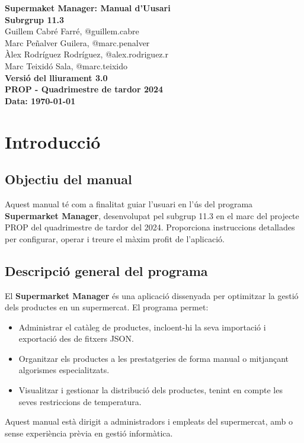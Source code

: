 \documentclass[a4paper,12pt]{article}
\newcommand{\titolPractica}{Supermaket Manager: \textbf{Manual d'Uusari}}
\newcommand{\identificadorEquip}{Subrgrup 11.3}
\newcommand{\PROPquatrimestre}{PROP - Quadrimestre de tardor 2024}
\newcommand{\versioLliurament}{Versió del lliurament 3.0}
\begin{document}
	
	\begin{titlepage}
		\begin{center}
			{\Large \textbf{\titolPractica}} \\[10cm]
			\textbf{\large \identificadorEquip} \\[1cm]
			Guillem Cabré Farré, \small{@guillem.cabre} \\
			Marc Peñalver Guilera, \small{@marc.penalver} \\
			Àlex Rodríguez Rodríguez, \small{@alex.rodriguez.r} \\
			Marc Teixidó Sala, \small{@marc.teixido} \\[2cm]
			\textbf{\versioLliurament} \\
			\textbf{\PROPquatrimestre} \\
			\textbf{Data: \today}
		\end{center}
	\end{titlepage}
	
	\tableofcontents
	\clearpage
	
	\section{Introducció}
	\subsection{Objectiu del manual}
	Aquest manual té com a finalitat guiar l'usuari en l'ús del programa \textbf{Supermarket Manager}, desenvolupat pel subgrup 11.3 en el marc del projecte PROP del quadrimestre de tardor del 2024. Proporciona instruccions detallades per configurar, operar i treure el màxim profit de l'aplicació.
	
	\subsection{Descripció general del programa}
	El \textbf{Supermarket Manager} és una aplicació dissenyada per optimitzar la gestió dels productes en un supermercat. El programa permet:
	\begin{itemize}
		\item Administrar el catàleg de productes, incloent-hi la seva importació i exportació des de fitxers JSON.
		\item Organitzar els productes a les prestatgeries de forma manual o mitjançant algorismes especialitzats.
		\item Visualitzar i gestionar la distribució dels productes, tenint en compte les seves restriccions de temperatura.
	\end{itemize}
	Aquest manual està dirigit a administradors i empleats del supermercat, amb o sense experiència prèvia en gestió informàtica.
	
\end{document}
